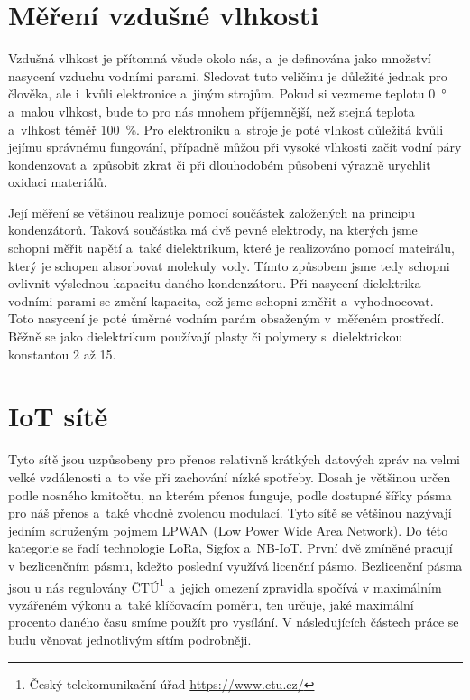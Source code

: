 \section{Měření vzdušné vlhkosti}

Vzdušná vlhkost je přítomná všude okolo nás, a~je definována jako množství nasycení vzduchu vodními parami. Sledovat tuto veličinu je důležité jednak pro člověka, ale i~kvůli elektronice a~jiným strojům. Pokud si vezmeme teplotu \SI{0}{\degree} a~malou vlhkost, bude to pro nás mnohem příjemnější, než stejná teplota a~vlhkost téměř \SI{100}{\percent}. Pro elektroniku a~stroje je poté vlhkost důležitá kvůli jejímu správnému fungování, případně můžou při vysoké vlhkosti začít vodní páry kondenzovat a~způsobit zkrat či při dlouhodobém působení výrazně urychlit oxidaci materiálů.

Její měření se většinou realizuje pomocí součástek založených na principu kondenzátorů. Taková součástka má dvě pevné elektrody, na kterých jsme schopni měřit napětí a~také dielektrikum, které je realizováno pomocí mateirálu, který je schopen absorbovat molekuly vody. Tímto způsobem jsme tedy schopni ovlivnit výslednou kapacitu daného kondenzátoru. Při nasycení dielektrika vodními parami se změní kapacita, což jsme schopni změřit a~vyhodnocovat. Toto nasycení je poté úměrné vodním parám obsaženým v~měřeném prostředí. Běžně se jako dielektrikum používají plasty či polymery s~dielektrickou konstantou 2 až 15.

\section{IoT sítě}

Tyto sítě jsou uzpůsobeny pro přenos relativně krátkých datových zpráv na velmi velké vzdálenosti a~to vše při zachování nízké spotřeby. Dosah je většinou určen podle nosného kmitočtu, na kterém přenos funguje, podle dostupné šířky pásma pro náš přenos a~také vhodně zvolenou modulací. Tyto sítě se většinou nazývají jedním sdruženým pojmem LPWAN (Low Power Wide Area Network). Do této kategorie se řadí technologie LoRa, Sigfox a~NB-IoT. První dvě zmíněné pracují v bezlicenčním pásmu, kdežto poslední využívá licenční pásmo. Bezlicenční pásma jsou u nás regulovány ČTÚ\footnote{Český telekomunikační úřad \url{https://www.ctu.cz/}} a~jejich omezení zpravidla spočívá v maximálním vyzářeném výkonu a~také klíčovacím poměru, ten určuje, jaké maximální procento daného času smíme použít pro vysílání. V následujících částech práce se budu věnovat jednotlivým sítím podrobněji.


